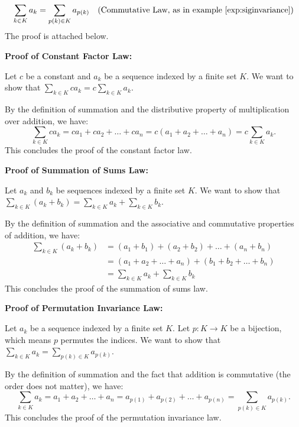 \begin{equation}
    \sum_{k \in K} a_k = \sum_{p(k) \in K} a_{p(k)} \quad \text{(Commutative Law, as in example \autoref{exp:siginvariance})} 
    \label{eq:permutation_invariance}
\end{equation}
The proof is attached below.

\textbf{Proof of Constant Factor Law:}

Let \( c \) be a constant and \( a_k \) be a sequence indexed by a finite set \( K \). We want to show that \( \sum_{k \in K} c a_k = c \sum_{k \in K} a_k \).

By the definition of summation and the distributive property of multiplication over addition, we have:
\begin{equation}
    \sum_{k \in K} c a_k = c a_1 + c a_2 + \ldots + c a_n = c (a_1 + a_2 + \ldots + a_n) = c \sum_{k \in K} a_k.
\end{equation}
This concludes the proof of the constant factor law.

\textbf{Proof of Summation of Sums Law:}

Let \( a_k \) and \( b_k \) be sequences indexed by a finite set \( K \). We want to show that \( \sum_{k \in K} (a_k + b_k) = \sum_{k \in K} a_k + \sum_{k \in K} b_k \).

By the definition of summation and the associative and commutative properties of addition, we have:
\begin{equation}
    \begin{split}
\sum_{k \in K} (a_k + b_k) &= (a_1 + b_1) + (a_2 + b_2) + \ldots + (a_n + b_n) \\
&= (a_1 + a_2 + \ldots + a_n) + (b_1 + b_2 + \ldots + b_n) \\
&= \sum_{k \in K} a_k + \sum_{k \in K} b_k
\end{split}
\label{eq:sum_of_sums}
\end{equation}
This concludes the proof of the summation of sums law.

\textbf{Proof of Permutation Invariance Law:}

Let \( a_k \) be a sequence indexed by a finite set \( K \). Let \( p: K \to K \) be a bijection, which means \( p \) permutes the indices. We want to show that \( \sum_{k \in K} a_k = \sum_{p(k) \in K} a_{p(k)} \).

By the definition of summation and the fact that addition is commutative (the order does not matter), we have:
\begin{equation}
    \sum_{k \in K} a_k = a_1 + a_2 + \ldots + a_n = a_{p(1)} + a_{p(2)} + \ldots + a_{p(n)} = \sum_{p(k) \in K} a_{p(k)}.
\end{equation}
This concludes the proof of the permutation invariance law.
